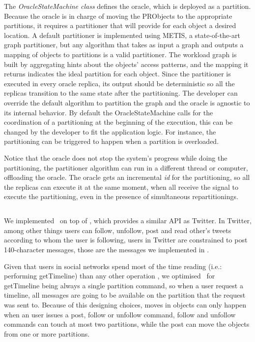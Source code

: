 The \emph{OracleStateMachine class} defines the oracle, which is deployed as a partition. 
Because the oracle is in charge of moving the PRObjects to the appropriate 
partitions, it requires a partitioner that will provide for each object a desired location. A default partitioner is implemented using METIS, a state-of-the-art graph partitioner, but any algorithm that takes as input a graph and outputs a mapping of objects to partitions is a valid
partitioner.
The workload graph is built by aggregating hints about the objects' access patterns, and the mapping it returns indicates the ideal partition for each object. Since the partitioner is executed in every oracle replica,
its output should be deterministic so all the replicas transition to the same state after the partitioning. 
The developer can override the default algorithm to partition the graph and the oracle is agnostic to its internal behavior.
By default the OracleStateMachine calls for the coordination of a partitioning at the beginning of the execution, this can be
changed by the developer to fit the application logic. For instance, the partitioning can be triggered to 
happen when a partition is overloaded.

Notice that the oracle does not stop the system's progress while doing the partitioning, the partitioner algorithm can
 run in a different thread or computer, offloading the oracle. The oracle gets an incremental \emph{id} for the partitioning, 
 so all the replicas can execute it at the same moment, when all receive the signal to execute the partitioning, 
 even in the presence of simultaneous repartitionings.

\subsection{\appname}
\label{sec:imp:\appname}
We implemented \appname\ on top of \libname, which provides a similar API as Twitter. In Twitter, among other things
users can follow, unfollow, post and read other's tweets according to whom the user is following, users in Twitter are
constrained to post 140-character messages, those are the messages we implemented in \appname.

Given that users in social networks spend most of the time reading (i.e.: performing getTimeline) than any other operation 
\cite{facebookTAO}, we optimised \appname\ for getTimeline being always a single partition command, so when a
user request a timeline, all messages are going to be available on the partition that the request was sent to.
Because of this designing choices, moves in objects can only happen when an user issues a post, follow or unfollow
command, follow and unfollow commands can touch at most two partitions, while the post can move the objects from
one or more partitions.

